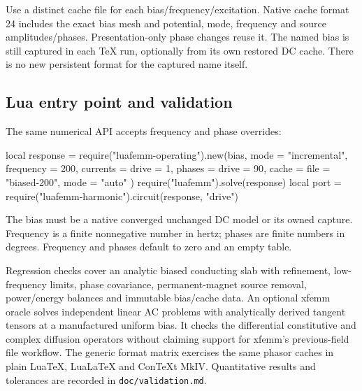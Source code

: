 Use a distinct cache file for each bias/frequency/excitation. Native cache
format 24 includes the exact bias mesh and potential, mode, frequency and
source amplitudes/phases. Presentation-only phase changes reuse it. The named
bias is still captured in each TeX run, optionally from its own restored DC
cache. There is no new persistent format for the captured name itself.

\subsection{Lua entry point and validation}
The same numerical API accepts frequency and phase overrides:
\begin{codeexample}
local response = require("luafemm-operating").new(bias, {
  mode = "incremental", frequency = 200,
  currents = {drive = 1}, phases = {drive = 90},
  cache = {file = "biased-200", mode = "auto"}
})
require("luafemm").solve(response)
local port = require("luafemm-harmonic").circuit(response, "drive")
\end{codeexample}
The bias must be a native converged unchanged DC model or its owned capture.
Frequency is a finite nonnegative number in hertz; phases are finite numbers
in degrees. Frequency and phases default to zero and an empty table.

Regression checks cover an analytic biased conducting slab with refinement,
low-frequency limits, phase covariance, permanent-magnet source removal,
power/energy balances and immutable bias/cache data. An optional xfemm oracle
solves independent linear AC problems with analytically derived tangent tensors
at a manufactured uniform bias. It checks the differential constitutive and
complex diffusion operators without claiming support for xfemm's previous-field
file workflow. The generic format matrix exercises the same phasor caches in
plain LuaTeX, LuaLaTeX and ConTeXt MkIV. Quantitative results and tolerances are
recorded in \nolinkurl{doc/validation.md}.
